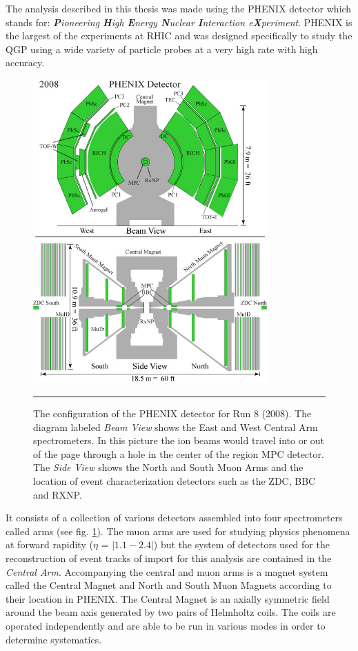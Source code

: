 \indent The analysis described in this thesis was made using the PHENIX detector which stands for: \textit{\textbf{P}ioneering \textbf{H}igh \textbf{E}nergy \textbf{N}uclear \textbf{I}nteraction e\textbf{X}periment}. PHENIX is the largest of the experiments at RHIC and was designed specifically to study the QGP using a wide variety of particle probes at a very high rate with high accuracy.  
\begin{figure}[htbp]
  \centering
    \includegraphics[width=0.8\textwidth]{Figures/Phenix_2008.jpg}
    \rule{35em}{0.5pt}
  \caption[PHENIX Detector Configuration for RHIC Run 8 (2008)]{The configuration of the PHENIX detector for Run 8 (2008). The diagram labeled \textit{Beam View} shows the East and West Central Arm spectrometers. In this picture the ion beams would travel into or out of the page through a hole in the center of the region MPC detector. The \textit{Side View} shows the North and South Muon Arms and the location of event characterization detectors such as the ZDC, BBC and RXNP.}
  \label{fig:run8config}
\end{figure}
It consists of a collection of various detectors assembled into four spectrometers called arms (see fig. \ref{fig:run8config}). The muon arms are used for studying physics phenomena at forward rapidity ($\eta$ = $|1.1-2.4|$)\citep{rapidityref} but the system of detectors used for the reconstruction of event tracks of import for this analysis are contained in the \textit{Central Arm}. Accompanying the central and muon arms is a magnet system called the Central Magnet and North and South Muon Magnets according to their location in PHENIX. The Central Magnet is an axially symmetric field around the beam axis generated by two pairs of Helmholtz coils. The coils are operated independently and are able to be run in various modes in order to determine systematics\citep{rolnickthesis}.

